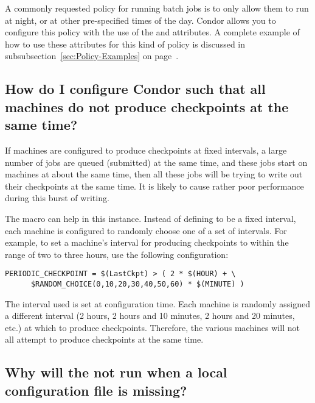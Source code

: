 A commonly requested policy for running batch jobs is to only allow
them to run at night, or at other pre-specified times of the day.
Condor allows you to configure this policy with the use of the
 and   attributes.  
A complete example of how to use these attributes for this kind of
policy is discussed in subsubsection~\ref{sec:Policy-Examples} on
page~\pageref{sec:Policy-Examples}.


\subsection*{How do I configure Condor such that all machines do not produce checkpoints at the same time?}
\label{sec:randomchoiceusage}
If machines are configured to produce checkpoints at fixed intervals,
a large number of jobs are queued (submitted) at the same time,
and these jobs start on machines at about the same time,
then all these jobs will be trying to write out their checkpoints
at the same time.
It is likely to cause rather poor performance during this burst of
writing.

The  macro can help in this instance.
Instead of defining  to be a fixed
interval, each machine is configured to randomly choose 
one of a set of intervals.
For example, to set a machine's interval for producing checkpoints
to within the range of two to three hours, use the following
configuration:
\begin{verbatim}
PERIODIC_CHECKPOINT = $(LastCkpt) > ( 2 * $(HOUR) + \
      $RANDOM_CHOICE(0,10,20,30,40,50,60) * $(MINUTE) )
\end{verbatim}

The interval used is set at configuration time.
Each machine is randomly assigned a different interval 
(2 hours, 2 hours and 10 minutes, 2 hours and 20 minutes, etc.)
at which to produce checkpoints.
Therefore, the various machines will not all attempt to
produce checkpoints at the same time.

\subsection*{Why will the  not run when a local configuration file is missing?}

